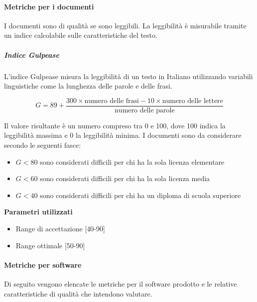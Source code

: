 \paragraph{Metriche per i documenti}
I documenti sono di qualità se sono leggibili. La leggibilità è
misurabile tramite un indice calcolabile sulle caratteristiche del
testo.

\subparagraph{Indice Gulpease}
L'indice Gulpease misura la leggibilità di un testo in Italiano
utilizzando variabili linguistiche come la lunghezza delle parole e
delle frasi.

$$
G = 89 + \frac{300 \times \text{numero delle frasi} - 10 \times \text{numero delle lettere}}{\text{numero
    delle parole}}
$$

Il valore risultante è un numero compreso tra 0 e 100, dove 100 indica
la
leggibilità massima e 0 la leggibilità minima. I documenti sono da
considerare secondo le seguenti fasce:
\begin{itemize}
\item $ G < 80 $ sono considerati difficili per chi ha la sola licenza
  elementare
\item $ G < 60 $ sono considerati difficili per chi ha la sola licenza
  media
\item $ G < 40 $ sono considerati difficili per chi ha un diploma di
  scuola  superiore
\end{itemize}

\textbf{Parametri utilizzati}\\
\begin{itemize}
\item Range di accettazione [40-90]
\item Range ottimale [50-90]
\end{itemize}







\paragraph{Metriche per software}
Di seguito vengono elencate le metriche per il software prodotto e le relative caratteristiche di
qualità che intendono valutare.

